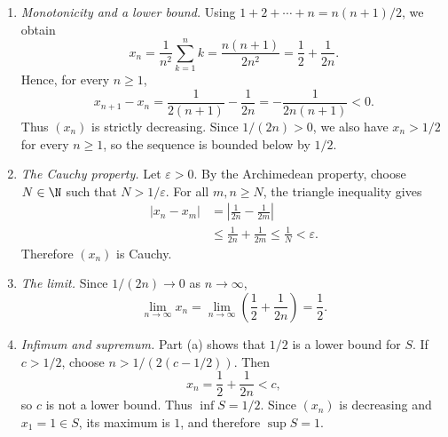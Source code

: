 \leavevmode
\begin{enumerate}
  \item \textit{Monotonicity and a lower bound.}
    Using $1+2+\cdots+n=n(n+1)/2$, we obtain
    \[
      x_n=\frac1{n^2}\sum_{k=1}^n k
        =\frac{n(n+1)}{2n^2}
        =\frac12+\frac1{2n}.
    \]
    Hence, for every $n\geq1$,
    \[
      x_{n+1}-x_n
        =\frac1{2(n+1)}-\frac1{2n}
        =-\frac1{2n(n+1)}<0.
    \]
    Thus $(x_n)$ is strictly decreasing. Since $1/(2n)>0$,
    we also have $x_n>1/2$ for every $n\geq1$, so the sequence
    is bounded below by $1/2$.

  \item \textit{The Cauchy property.}
    Let $\varepsilon>0$. By the Archimedean property, choose
    $N\in\N$ such that $N>1/\varepsilon$. For all $m,n\geq N$,
    the triangle inequality gives
    \[
      \begin{aligned}
        |x_n-x_m|
          &=\left|\frac1{2n}-\frac1{2m}\right|\\
          &\leq\frac1{2n}+\frac1{2m}
          \leq\frac1N<\varepsilon.
      \end{aligned}
    \]
    Therefore $(x_n)$ is Cauchy.

  \item \textit{The limit.}
    Since $1/(2n)\to0$ as $n\to\infty$,
    \[
      \lim_{n\to\infty}x_n
        =\lim_{n\to\infty}\left(\frac12+\frac1{2n}\right)
        =\frac12.
    \]

  \item \textit{Infimum and supremum.}
    Part (a) shows that $1/2$ is a lower bound for $S$.
    If $c>1/2$, choose $n>1/(2(c-1/2))$. Then
    \[
      x_n=\frac12+\frac1{2n}<c,
    \]
    so $c$ is not a lower bound. Thus $\inf S=1/2$.
    Since $(x_n)$ is decreasing and $x_1=1\in S$, its maximum
    is $1$, and therefore $\sup S=1$.
\end{enumerate}
